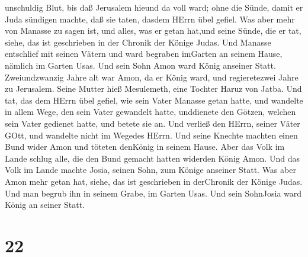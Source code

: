 unschuldig Blut, bis daß Jerusalem hieund da voll ward; ohne die Sünde,
damit er Juda sündigen machte, daß sie taten, dasdem HErrn übel gefiel.
 Was aber mehr von Manasse zu sagen ist, und alles, was er
getan hat,und seine Sünde, die er tat, siehe, das ist geschrieben in der
Chronik der Könige Judas.  Und Manasse entschlief mit
seinen Vätern und ward begraben imGarten an seinem Hause, nämlich im
Garten Usas. Und sein Sohn Amon ward König anseiner Statt. 
Zweiundzwanzig Jahre alt war Amon, da er König ward, und regieretezwei
Jahre zu Jerusalem. Seine Mutter hieß Mesulemeth, eine Tochter Haruz von
Jatba.  Und tat, das dem HErrn übel gefiel, wie sein Vater
Manasse getan hatte,  und wandelte in allem Wege, den sein
Vater gewandelt hatte, unddienete den Götzen, welchen sein Vater
gedienet hatte, und betete sie an.  Und verließ den HErrn,
seiner Väter GOtt, und wandelte nicht im Wegedes HErrn. 
Und seine Knechte machten einen Bund wider Amon und töteten denKönig in
seinem Hause.  Aber das Volk im Lande schlug alle, die den
Bund gemacht hatten widerden König Amon. Und das Volk im Lande machte
Josia, seinen Sohn, zum Könige anseiner Statt.  Was aber
Amon mehr getan hat, siehe, das ist geschrieben in derChronik der Könige
Judas.  Und man begrub ihn in seinem Grabe, im Garten Usas.
Und sein SohnJosia ward König an seiner Statt.

\hypertarget{section-21}{%
\section{22}\label{section-21}}

